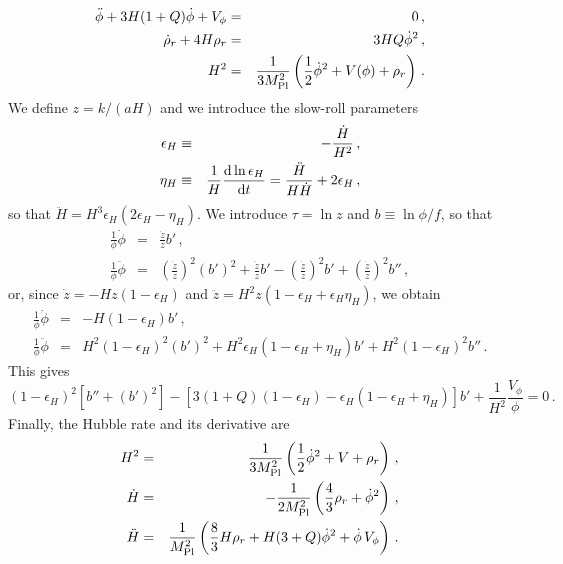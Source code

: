 \begin{eqnarray}
    \ddot\phi+3H(1+Q)\dot\phi+V_\phi &=& 0\,,\label{eq:phi}\\
    \dot\rho_r + 4H\rho_r &=& 3HQ\dot\phi^2\,,\label{eq:rhoR}\\
    H^2 &=& \frac{1}{3M_{\rm Pl}^2}\left(\frac{1}{2}\dot\phi^2 + V(\phi) + \rho_r\right)\,.
\end{eqnarray}
We define $z =k/(aH)$ and we introduce the slow-roll parameters
\begin{eqnarray}
    \epsilon_H &\equiv& -\frac{\dot H}{H^2}\,,\label{def_epsilonH}\\
    \eta_H &\equiv& \frac{1}{H}\frac{{\rm d}\ln\epsilon_H}{{\rm d}t} = \frac{\ddot H}{H \dot H} + 2\epsilon_H\,,
\end{eqnarray}
so that $\ddot H = H^3\epsilon_H(2\epsilon_H-\eta_H)$. We introduce $\tau = \ln z$ and $b \equiv \ln \phi/f$, so that
\begin{eqnarray}
    \frac{1}{\phi}\dot \phi &=& \frac{\dot z}{z} b'\,,\\
    \frac{1}{\phi}\ddot \phi &=& \left(\frac{\dot z}{z}\right)^2(b')^2 + \frac{\ddot z}{z}b' - \left(\frac{\dot z}{z}\right)^2b' + \left(\frac{\dot z}{z}\right)^2b''\,,
\end{eqnarray}
or, since $\dot z = -Hz(1-\epsilon_H)$ and $\ddot z = H^2z(1-\epsilon_H+\epsilon_H\eta_H)$, we obtain
\begin{eqnarray}
    \frac{1}{\phi}\dot \phi &=& -H(1-\epsilon_H) b'\,,\\
    \frac{1}{\phi}\ddot \phi &=& H^2(1-\epsilon_H)^2(b')^2 + H^2\epsilon_H(1-\epsilon_H+\eta_H)b' + H^2(1-\epsilon_H)^2b''\,.
\end{eqnarray}
This gives
\begin{equation}
    \label{eq:phiEQM}
    (1-\epsilon_H)^2[b''+(b')^2] - [3(1+Q)(1-\epsilon_H)-\epsilon_H(1-\epsilon_H+\eta_H)]b' + \frac{1}{H^2}\frac{V_\phi}{\phi} = 0\,.
\end{equation}
Finally, the Hubble rate and its derivative are
\begin{eqnarray}
    H^2 &=& \frac{1}{3M_{\rm Pl}^2}\left(\frac{1}{2}\dot\phi^2 + V + \rho_r\right)\,,\label{eq:H2}\\
    \dot H &=& -\frac{1}{2M_{\rm Pl}^2}\left(\frac{4}{3}\rho_r + \dot\phi^2\right)\,,\label{eq:Hdot}\\
    \ddot H &=& \frac{1}{M_{\rm Pl}^2}\left(\frac{8}{3}H\rho_r + H(3+Q)\dot\phi^2+\dot\phi\,V_\phi\right)\,.
\end{eqnarray}

